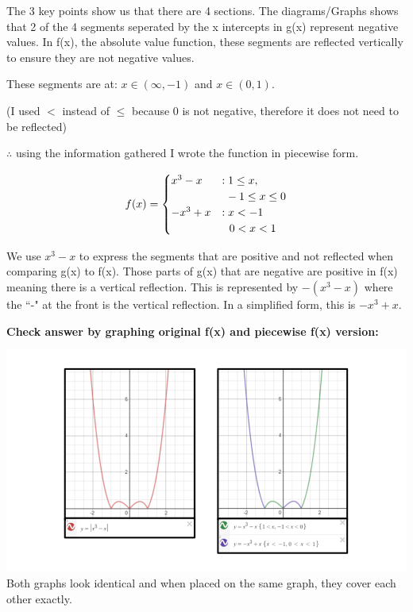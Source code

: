 \documentclass[12pt]{book}
\begin{document}
\begin{enumerate}
The 3 key points show us that there are 4 sections. The diagrams/Graphs shows that 2 of the 4 segments seperated by the x intercepts in g(x) represent negative values.
In f(x), the absolute value function, these segments are reflected vertically to ensure they are not negative values.
\vspace{1em}

\begin{center}
These segments are at: $ x \in (\infty, -1) $ and $ x \in (0, 1) $.

(I used $<$ instead of $\leq$ because 0 is not negative, therefore it does not need to be reflected)
\end{center}

$\therefore$ using the information gathered I wrote the function in piecewise form.
\vspace{1em}

$$
f(x) =
\begin{cases}
    x^3-x & : 1 \leq x, \\
    & \text{\space} -1 \leq x \leq 0 \\
    -x^3+x & : x < -1 \\
    & \text{\space \space} 0 < x < 1
\end{cases}
$$

\vspace{1em}
We use $x^3-x$ to express  the segments that are positive and not reflected when comparing g(x) to f(x).
\vspace{2em}
Those parts of g(x) that are negative are positive in f(x) meaning there is a vertical reflection. 
This is represented by $-(x^3-x)$ where the ``-" at the front is the vertical reflection. 
In a simplified form, this is $-x^3+x$.

\vspace{3em}
\textbf{Check answer by graphing original f(x) and piecewise f(x) version:}
\vspace{-1.5em}
\begin{center}
    \includegraphics[scale=0.5]{A1-4 proof.png}
    Both graphs look identical and when placed on the same graph, they cover each other exactly.
\end{center}


\end{enumerate}
\end{document}
